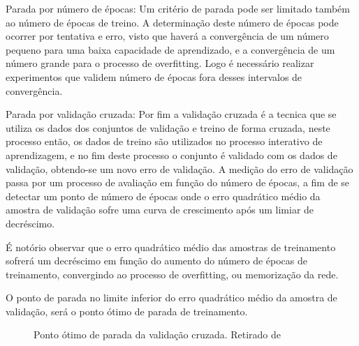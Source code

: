 \documentclass[	12pt, Times, openright, twoside, a4paper, english, brazil]{abntex2}
\begin{document}
          	Parada por número de épocas:
          	Um critério de parada pode ser limitado também ao número de épocas de treino. A determinação  deste número de épocas pode ocorrer por tentativa e erro, visto que haverá a convergência de um número pequeno para uma baixa capacidade de aprendizado, e a convergência de um número grande para o processo de overfitting. Logo é necessário realizar experimentos que validem número de épocas fora desses intervalos de convergência.
          	
          	Parada por validação cruzada:
          	Por fim a validação cruzada é a tecnica que se utiliza os dados dos conjuntos de validação e treino de forma cruzada, neste processo então, os dados de treino são utilizados no processo interativo de aprendizagem, e no fim deste processo o conjunto é validado com os dados de validação, obtendo-se um novo erro de validação.
          	A medição do erro de validação passa por um processo de avaliação em função do número de épocas, a fim de se detectar um ponto de número de épocas onde o erro quadrático médio da amostra de validação sofre uma curva de crescimento após um limiar de decréscimo.
          	
          	É notório observar que o erro quadrático médio das amostras de treinamento sofrerá um decréscimo em função do aumento do número de épocas de treinamento, convergindo ao processo de overfitting, ou memorização da rede.
          	
          	O ponto de parada no limite inferior do erro quadrático médio da amostra de validação, será o ponto ótimo de parada de treinamento.
          	
          	\begin{figure}[!ht]
          		\caption{Ponto ótimo de parada da validação cruzada. Retirado de \cite{Flavia2014} \label{fig:validacaoCruzada}}
          	\end{figure}
          	
\end{document}
